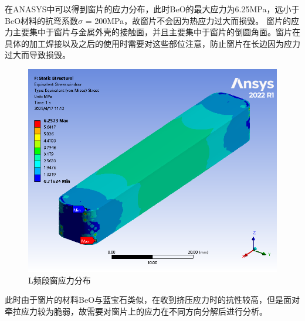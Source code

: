 \documentclass[master]{thesis-uestc}
\begin{document}
在ANASYS中可以得到窗片的应力分布，此时BeO的最大应力为6.25MPa，远小于BeO材料的抗弯系数\(\sigma\) = 200MPa，故窗片不会因为热应力过大而损毁。
窗片的应力主要集中于窗片与金属外壳的接触面，并且主要集中于窗片的倒圆角面。窗片在具体的加工焊接以及之后的使用时需要对这些部位注意，防止窗片在长边因为应力过大而导致损毁。
\begin{figure}[!htb]
    \centering
    \includegraphics[width=0.45\linewidth]{pic/chapter4/L频段窗应力.png}
    \caption{L频段窗应力分布}
    \label{fig:L频段窗应力分布}
\end{figure}

此时由于窗片的材料BeO与蓝宝石类似，在收到挤压应力时的抗性较高，但是面对牵拉应力较为脆弱，故需要对窗片上的应力在不同方向分解后进行分析。
\end{document}
